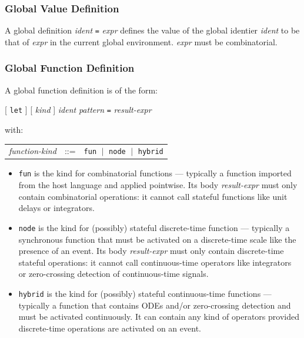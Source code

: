 \documentclass[11pt,titlepage,twoside]{report}
\newcommand{\alt}{\;|\;}
\newcommand{\term}[1]{{\tt #1}}
\newcommand{\nterm}[1]{{\em #1}}
\begin{document}
\subsubsection{Global Value Definition}

A global definition \nterm{ident} \term{=} \nterm{expr} defines the value
of the global identier \nterm{ident} to be that of \nterm{expr} in the
current global environment. \nterm{expr} must be combinatorial.

\subsubsection{Global Function Definition}

A global function definition is of the form:
\begin{center}
  [ \term{let} ] [ \nterm{kind} ] \nterm{ident} \nterm{pattern} \term{=}
                    \nterm{result-expr}
\end{center}
with:
\begin{center}
  \begin{tabular}{lcl}
    \nterm{function-kind} & ::=  & \term{fun} $\alt$ \term{node}
                                              $\alt$ \term{hybrid}
\end{tabular}
\end{center}

\begin{itemize}
\item
  \term{fun} is the kind for combinatorial functions --- typically a
  function imported from the host language and applied pointwise. Its
  body \nterm{result-expr} must only contain combinatorial operations:
  it cannot call stateful functions like unit delays or integrators.
\item
  \term{node} is the kind for (possibly) stateful discrete-time
  function --- typically a synchronous function that must be activated
  on a discrete-time scale like the presence of an event. Its body
  \nterm{result-expr} must only contain discrete-time stateful
  operations: it cannot call continuous-time operators like
  integrators or zero-crossing detection of continuous-time signals.
\item
  \term{hybrid} is the kind for (possibly) stateful continuous-time
  functions --- typically a function that contains ODEs and/or
  zero-crossing detection and must be activated continuously. It can
  contain any kind of operators provided discrete-time operations are activated
  on an event.
\end{itemize}
\end{document}
